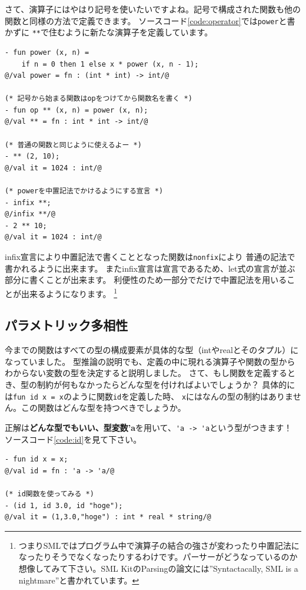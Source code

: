 \documentclass[11pt,a4paper]{article}
\begin{document}
さて、演算子にはやはり記号を使いたいですよね。記号で構成された関数も他の関数と同様の方法で定義できます。
ソースコード\ref{code:operator}では\lstinline{power}と書かずに
\lstinline{**}で住むように新たな演算子を定義しています。


\begin{lstlisting}[caption=演算子の定義,label=code:operator]
- fun power (x, n) =
    if n = 0 then 1 else x * power (x, n - 1);
@/val power = fn : (int * int) -> int/@

(* 記号から始まる関数はopをつけてから関数名を書く *)
- fun op ** (x, n) = power (x, n);
@/val ** = fn : int * int -> int/@

(* 普通の関数と同じように使えるよー *)
- ** (2, 10);
@/val it = 1024 : int/@

(* powerを中置記法でかけるようにする宣言 *)
- infix **;
@/infix **/@
- 2 ** 10;
@/val it = 1024 : int/@
\end{lstlisting}

infix宣言により中置記法で書くこととなった関数は\lstinline{nonfix}により
普通の記法で書かれるように出来ます。
またinfix宣言は宣言であるため、let式の宣言が並ぶ部分に書くことが出来ます。
利便性のため一部分でだけで中置記法を用いることが出来るようになります。
\footnote{つまりSMLではプログラム中で演算子の結合の強さが変わったり中置記法になったりそうでなくなったりするわけです。パーサーがどうなっているのか想像してみて下さい。SML KitのParsingの論文には''Syntactacally, SML is a nightmare''\cite{SML-KIT}と書かれています。}

\subsection{パラメトリック多相性}

今までの関数はすべての型の構成要素が具体的な型（intやrealとそのタプル）になっていました。
型推論の説明でも、定義の中に現れる演算子や関数の型からわからない変数の型を決定すると説明しました。
さて、もし関数を定義するとき、型の制約が何もなかったらどんな型を付ければよいでしょうか？
具体的には\lstinline{fun id x = x}のように関数\lstinline{id}を定義した時、
\lstinline{x}にはなんの型の制約はありません。この関数はどんな型を持つべきでしょうか。

正解は{\bfseries どんな型でもいい、型変数'a}を用いて、\lstinline{'a -> 'a}という型がつきます！
ソースコード\ref{code:id}を見て下さい。

\begin{lstlisting}[caption=多相関数,label=code:id]
- fun id x = x;
@/val id = fn : 'a -> 'a/@

(* id関数を使ってみる *)
- (id 1, id 3.0, id "hoge");
@/val it = (1,3.0,"hoge") : int * real * string/@
\end{lstlisting}
\end{document}
